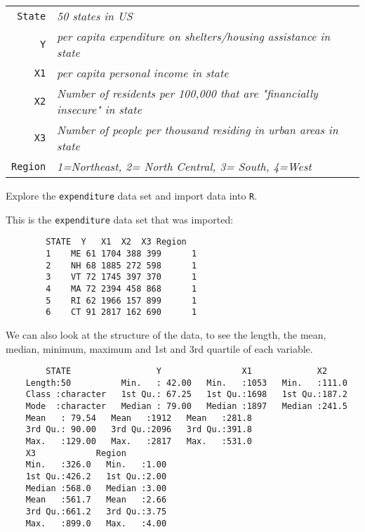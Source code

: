 \documentclass[12pt,letterpaper]{article}
\begin{document}
	\begin{tabular}{r|l}
		\texttt{State} & \emph{50 states in US} \\
		\texttt{Y} & \emph{per capita expenditure on shelters/housing assistance in state} \\
		\texttt{X1} & \emph{per capita personal income in state} \\
		\texttt{X2} & \emph{Number of residents per 100,000 that are "financially insecure" in state} \\
		\texttt{X3} & \emph{Number of people per thousand residing in urban areas in state} \\
		\texttt{Region} & \emph{1=Northeast, 2= North Central, 3= South, 4=West} \\
	\end{tabular}
	
	\vspace{.5cm}
	\noindent Explore the \texttt{expenditure} data set and import data into \texttt{R}.
	\vspace{.5cm}
	
	This is the \texttt{expenditure} data set that was imported: 
	\begin{verbatim}
		STATE  Y   X1  X2  X3 Region
		1    ME 61 1704 388 399      1
		2    NH 68 1885 272 598      1
		3    VT 72 1745 397 370      1
		4    MA 72 2394 458 868      1
		5    RI 62 1966 157 899      1
		6    CT 91 2817 162 690      1
	\end{verbatim}
	
	We can also look at the structure of the data, to see the length, the mean, median, minimum, maximum and 1st and 3rd quartile of each variable.
	\begin{verbatim}
	    STATE                 Y                X1             X2       
	Length:50          Min.   : 42.00   Min.   :1053   Min.   :111.0  
	Class :character   1st Qu.: 67.25   1st Qu.:1698   1st Qu.:187.2  
	Mode  :character   Median : 79.00   Median :1897   Median :241.5  
	Mean   : 79.54   Mean   :1912   Mean   :281.8  
	3rd Qu.: 90.00   3rd Qu.:2096   3rd Qu.:391.8  
	Max.   :129.00   Max.   :2817   Max.   :531.0  
	X3            Region    
	Min.   :326.0   Min.   :1.00  
	1st Qu.:426.2   1st Qu.:2.00  
	Median :568.0   Median :3.00  
	Mean   :561.7   Mean   :2.66  
	3rd Qu.:661.2   3rd Qu.:3.75  
	Max.   :899.0   Max.   :4.00 
	\end{verbatim}
		
	\newpage
	
\end{document}
